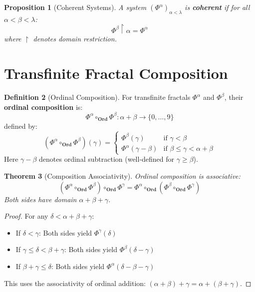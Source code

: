 \documentclass[11pt,twoside,openright]{book}
\theoremstyle{definition}
\newtheorem{definition}{Definition}[chapter]
\theoremstyle{plain}
\newtheorem{theorem}[definition]{Theorem}
\newtheorem{proposition}[definition]{Proposition}
\theoremstyle{remark}
\newcommand{\Ord}{\mathbf{Ord}}              %
\newcommand{\TransFrac}[1]{\Phi^{#1}}        %
\begin{document}
\begin{proposition}[Coherent Systems]
\label{prop:coherent-systems}
A system $(\TransFrac{\alpha})_{\alpha < \lambda}$ is \textbf{coherent} if for all $\alpha < \beta < \lambda$:
\[
\TransFrac{\beta} \restriction \alpha = \TransFrac{\alpha}
\]
where $\restriction$ denotes domain restriction.
\end{proposition}

\section{Transfinite Fractal Composition}

\begin{definition}[Ordinal Composition]
\label{def:ordinal-composition}
For transfinite fractals $\TransFrac{\alpha}$ and $\TransFrac{\beta}$, their \textbf{ordinal composition} is:
\[
\TransFrac{\alpha} \circ_\Ord \TransFrac{\beta} : \alpha + \beta \to \{0, \ldots, 9\}
\]
defined by:
\[
(\TransFrac{\alpha} \circ_\Ord \TransFrac{\beta})(\gamma) =
\begin{cases}
\TransFrac{\beta}(\gamma) & \text{if } \gamma < \beta \\
\TransFrac{\alpha}(\gamma - \beta) & \text{if } \beta \leq \gamma < \alpha + \beta
\end{cases}
\]
Here $\gamma - \beta$ denotes ordinal subtraction (well-defined for $\gamma \geq \beta$).
\end{definition}

\begin{theorem}[Composition Associativity]
\label{thm:transfinite-assoc}
Ordinal composition is associative:
\[
(\TransFrac{\alpha} \circ_\Ord \TransFrac{\beta}) \circ_\Ord \TransFrac{\gamma} = \TransFrac{\alpha} \circ_\Ord (\TransFrac{\beta} \circ_\Ord \TransFrac{\gamma})
\]
Both sides have domain $\alpha + \beta + \gamma$.
\end{theorem}

\begin{proof}
For any $\delta < \alpha + \beta + \gamma$:
\begin{itemize}
  \item If $\delta < \gamma$: Both sides yield $\TransFrac{\gamma}(\delta)$
  \item If $\gamma \leq \delta < \beta + \gamma$: Both sides yield $\TransFrac{\beta}(\delta - \gamma)$
  \item If $\beta + \gamma \leq \delta$: Both sides yield $\TransFrac{\alpha}(\delta - \beta - \gamma)$
\end{itemize}
This uses the associativity of ordinal addition: $(\alpha + \beta) + \gamma = \alpha + (\beta + \gamma)$.
\end{proof}
\end{document}
